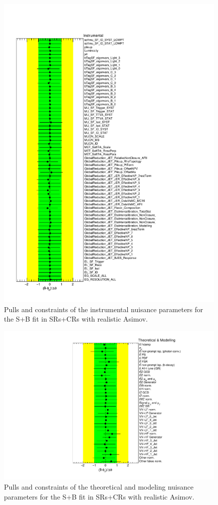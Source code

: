 \begin{figure}[htbp]
	\centering
	\includegraphics[width=.8\textwidth]{Appendices/AP8/figures/SPLUSB_CRSR_UsingSMTFullSys/NuisPar_Instrumental}
	\caption{Pulls and constraints of the instrumental nuisance parameters for the S+B \tZc fit in SRs+CRs with realistic Asimov.}%
	\label{fig:stat_smt:tzc:splusb:crsr:np:instr}
\end{figure}

\begin{figure}[htbp]
	\centering
	\includegraphics[width=.85\textwidth]{Appendices/AP8/figures/SPLUSB_CRSR_UsingSMTFullSys/NuisPar_Theoretical_&_Modelling}
	\caption{Pulls and constraints of the theoretical and modeling nuisance parameters for the S+B \tZc fit in SRs+CRs with realistic Asimov.}%
	\label{fig:stat_smt:tzc:splusb:crsr:np:model}
\end{figure}

